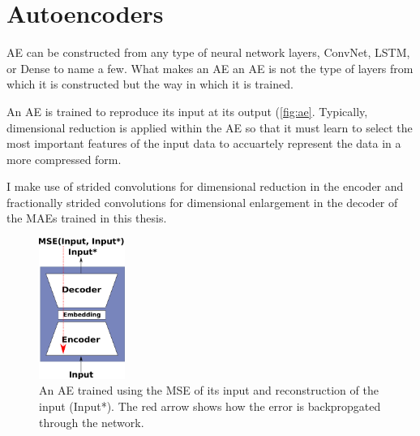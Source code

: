 %
%	
%
%	

\section{Autoencoders}
\ac{AE} can be constructed from any type of neural network layers, \ac{ConvNet}, \ac{LSTM}, or Dense to name a few. What makes an \ac{AE} an \ac{AE} is not the type of layers from which it is constructed but the way in which it is trained.

An \ac{AE} is trained to reproduce its input at its output (\autoref{fig:ae}. Typically, dimensional reduction is applied within the AE so that it must learn to select the most important features of the input data to accuartely represent the data in a more compressed form. 

I make use of strided convolutions for dimensional reduction in the encoder and fractionally strided convolutions for dimensional enlargement in the decoder of the \acp{MAE} trained in this thesis.

\begin{figure}
	\centering
	\includegraphics[width=0.25\textwidth]{Figs/intro2dl/AE.png}
	
	\caption{An \ac{AE} trained using the \ac{MSE} of its input and reconstruction of the input (Input*). The red arrow shows how the error is backpropgated through the network.}
	\label{fig:ae}
\end{figure}



